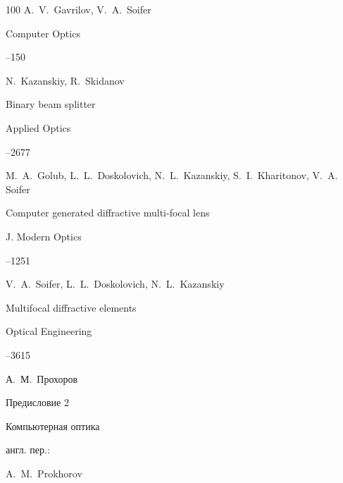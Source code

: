 \begin{thebibliography}{100}
\by A.~V.~Gavrilov, V.~A.~Soifer


\jour Computer Optics 



--150






\by N.~Kazanskiy, R.~Skidanov

\paper Binary beam splitter

\jour Applied Optics




--2677




\by M.~A.~Golub, L.~L.~Doskolovich, N.~L.~Kazanskiy, S.~I.~Kharitonov, V.~A. Soifer

\paper Computer generated diffractive multi-focal lens 

\jour J. Modern Optics




--1251




\by V.~A.~Soifer, L.~L.~Doskolovich, N.~L.~Kazanskiy

\paper Multifocal diffractive elements

\jour Optical Engineering




--3615




\by А.~М.~Прохоров

\paper Предисловие 2

\jour Компьютерная оптика




\transl англ. пер.:~

\by A.~M.~Prokhorov


\end{thebibliography}
